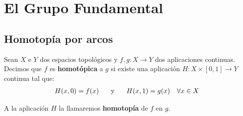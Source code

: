 \chapter{El Grupo Fundamental}

\section{Homotopía por arcos}

\begin{definicion}
    Sean $X$ e $Y$ dos espacios topológicos y $f,g:X\to Y$ dos aplicaciones continuas. Decimos que $f$ es \textbf{homotópica} a $g$ si existe una aplicación $H:X\times[0,1]\to Y$ continua tal que: 
    \begin{gather*}
        H(x,0) = f(x) \hspace{0.5cm} \text{ y } \hspace{0.5cm} H(x,1) = g(x) \ \ \ \forall x\in X
    \end{gather*}

    A la aplicación $H$ la llamaremos \textbf{homotopía} de $f$ en $g$.
\end{definicion}

